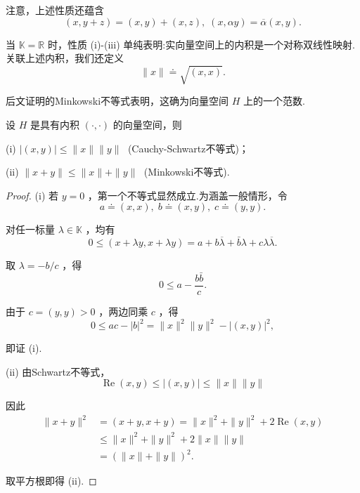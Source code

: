 注意，上述性质还蕴含
\begin{equation}\tag{5.1}\label{eq:inner-product-linearity}
\left( {x,y + z}\right)  = \left( {x,y}\right)  + \left( {x,z}\right) ,\;\left( {x,{\alpha y}}\right)  = \overline{\alpha }\left( {x,y}\right) .
\end{equation}

当 $\mathbb{K} = \mathbb{R}$ 时，性质 (i)-(iii) 单纯表明:实向量空间上的内积是一个对称双线性映射.关联上述内积，我们还定义
\begin{equation}\tag{5.2}\label{eq:norm-from-inner-product}
\| x\|  \doteq  \sqrt{\left( x,x\right) }.
\end{equation}

后文证明的Minkowski不等式表明，这确为向量空间 $H$ 上的一个范数.

\begin{theorem}[两个基本不等式]\label{thm:basic-inequalities}
设 $H$ 是具有内积 $\left( {\cdot , \cdot  }\right)$ 的向量空间，则

(i) $\left| \left( {x,y}\right) \right|  \leq  \| x\| \| y\| \;$ (Cauchy-Schwartz不等式)；

(ii) $\| x + y\|  \leq  \| x\|  + \| y\| \;$ (Minkowski不等式).
\end{theorem}

\begin{proof}
(i) 若 $y = 0$ ，第一个不等式显然成立.为涵盖一般情形，令
\[
a \doteq  \left( {x,x}\right) ,\;b \doteq  \left( {x,y}\right) ,\;c \doteq  \left( {y,y}\right) .
\]

对任一标量 $\lambda  \in  \mathbb{K}$ ，均有
\[
0 \leq  \left( {x + {\lambda y},x + {\lambda y}}\right)  = a + b\overline{\lambda } + \bar{b}\lambda  + {c\lambda }\overline{\lambda }.
\]

取 $\lambda  =  - b/c$ ，得
\[
0 \leq  a - \frac{b\bar{b}}{c}.
\]

由于 $c = \left( {y,y}\right)  > 0$ ，两边同乘 $c$ ，得
\[
0 \leq  {ac} - {\left| b\right| }^{2} = \| x{\| }^{2}\| y{\| }^{2} - {\left| \left( x,y\right) \right| }^{2},
\]

即证 (i).

\noindent (ii) 由Schwartz不等式，
\[
\operatorname{Re}\left( {x,y}\right)  \leq  \left| \left( {x,y}\right) \right|  \leq  \| x\| \| y\|
\]

因此
{\setjot[-2]\begin{align*}
    \| x + y{\| }^{2} &= \left( {x + y,x + y}\right)  = \| x{\| }^{2} + \| y{\| }^{2} + 2\operatorname{Re}\left( {x,y}\right)\\
    &\leq  \| x{\| }^{2} + \| y{\| }^{2} + 2\| x\| \| y\| \\
    &= {\left( \| x\|  + \| y\| \right) }^{2}.
\end{align*}}


取平方根即得 (ii).
\end{proof}

